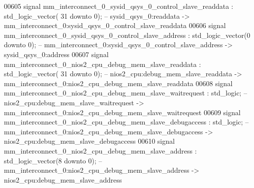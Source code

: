 \begin{DoxyCode}
00605     \textcolor{keywordflow}{signal} \textcolor{vhdlchar}{mm_interconnect_0_sysid_qsys_0_control_slave_readdata}                       \textcolor{vhdlchar}{:} \textcolor{comment}{std\_logic\_vector}\textcolor{vhdlchar}{(}\textcolor{vhdllogic}{}\textcolor{vhdllogic}{
      31} \textcolor{keywordflow}{downto} \textcolor{vhdllogic}{}\textcolor{vhdllogic}{0}\textcolor{vhdlchar}{)};\textcolor{keyword}{ -- sysid\_qsys\_0:readdata -> mm\_interconnect\_0:sysid\_qsys\_0\_control\_slave\_readdata}
00606     \textcolor{keywordflow}{signal} \textcolor{vhdlchar}{mm_interconnect_0_sysid_qsys_0_control_slave_address}                        \textcolor{vhdlchar}{:} \textcolor{comment}{std\_logic\_vector}\textcolor{vhdlchar}{(}\textcolor{vhdllogic}{}\textcolor{vhdllogic}{0}
       \textcolor{keywordflow}{downto} \textcolor{vhdllogic}{}\textcolor{vhdllogic}{0}\textcolor{vhdlchar}{)};\textcolor{keyword}{  -- mm\_interconnect\_0:sysid\_qsys\_0\_control\_slave\_address -> sysid\_qsys\_0:address}
00607     \textcolor{keywordflow}{signal} \textcolor{vhdlchar}{mm_interconnect_0_nios2_cpu_debug_mem_slave_readdata}                        \textcolor{vhdlchar}{:} \textcolor{comment}{std\_logic\_vector}\textcolor{vhdlchar}{(}\textcolor{vhdllogic}{}\textcolor{vhdllogic}{
      31} \textcolor{keywordflow}{downto} \textcolor{vhdllogic}{}\textcolor{vhdllogic}{0}\textcolor{vhdlchar}{)};\textcolor{keyword}{ -- nios2\_cpu:debug\_mem\_slave\_readdata -> mm\_interconnect\_0:nios2\_cpu\_debug\_mem\_slave\_readdata}
00608     \textcolor{keywordflow}{signal} \textcolor{vhdlchar}{mm_interconnect_0_nios2_cpu_debug_mem_slave_waitrequest}                     \textcolor{vhdlchar}{:} \textcolor{comment}{std\_logic};\textcolor{keyword}{        
                   -- nios2\_cpu:debug\_mem\_slave\_waitrequest ->
       mm\_interconnect\_0:nios2\_cpu\_debug\_mem\_slave\_waitrequest}
00609     \textcolor{keywordflow}{signal} \textcolor{vhdlchar}{mm_interconnect_0_nios2_cpu_debug_mem_slave_debugaccess}                     \textcolor{vhdlchar}{:} \textcolor{comment}{std\_logic};\textcolor{keyword}{        
                   -- mm\_interconnect\_0:nios2\_cpu\_debug\_mem\_slave\_debugaccess ->
       nios2\_cpu:debug\_mem\_slave\_debugaccess}
00610     \textcolor{keywordflow}{signal} \textcolor{vhdlchar}{mm_interconnect_0_nios2_cpu_debug_mem_slave_address}                         \textcolor{vhdlchar}{:} \textcolor{comment}{std\_logic\_vector}\textcolor{vhdlchar}{(}\textcolor{vhdllogic}{}\textcolor{vhdllogic}{8}
       \textcolor{keywordflow}{downto} \textcolor{vhdllogic}{}\textcolor{vhdllogic}{0}\textcolor{vhdlchar}{)};\textcolor{keyword}{  -- mm\_interconnect\_0:nios2\_cpu\_debug\_mem\_slave\_address -> nios2\_cpu:debug\_mem\_slave\_address}

\end{DoxyCode}
